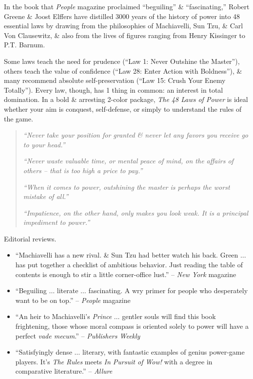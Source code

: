 \documentclass{article}
\begin{document}
\begin{enumerate}
	In the book that {\it People} magazine proclaimed ``beguiling'' \& ``fascinating,'' {\sc Robert Greene} \& {\sc Joost Elffers} have distilled 3000 years of the history of power into 48 essential laws by drawing from the philosophies of {\sc Machiavelli, Sun Tzu}, \& {\sc Carl Von Clausewitz}, \& also from the lives of figures ranging from {\sc Henry Kissinger} to {\sc P.T. Barnum}.
	
	Some laws teach the need for prudence (``Law 1: Never Outshine the Master''), others teach the value of confidence (``Law 28: Enter Action with Boldness''), \& many recommend absolute self-preservation (``Law 15: Crush Your Enemy Totally''). Every law, though, has 1 thing in common: an interest in total domination. In a bold \& arresting 2-color package, {\it The 48 Laws of Power} is ideal whether your aim is conquest, self-defense, or simply to understand the rules of the game.
	\begin{quotation}
		{\it``Never take your position for granted \& never let any favors you receive go to your head.''}
		
		{\it``Never waste valuable time, or mental peace of mind, on the affairs of others -- that is too high a price to pay.''}
		
		{\it``When it comes to power, outshining the master is perhaps the worst mistake of all.''}
		
		{\it``Impatience, on the other hand, only makes you look weak. It is a principal impediment to power.''}
	\end{quotation}
	{\sf Editorial reviews.}
	\begin{itemize}
		\item ``{\sc Machiavelli} has a new rival. \& {\sc Sun Tzu} had better watch his back. {\sc Green} $\ldots$ has put together a checklist of ambitious behavior. Just reading the table of contents is enough to stir a little corner-office lust.'' -- {\it New York} magazine
		\item ``Beguiling $\ldots$ literate $\ldots$ fascinating. A wry primer for people who desperately want to be on top.'' -- {\it People} magazine
		\item ``An heir to {\sc Machiavelli}'s {\it Prince} $\ldots$ gentler souls will find this book frightening, those whose moral compass is oriented solely to power will have a perfect {\it vade mecum}.'' -- {\it Publishers Weekly}
		\item ``Satisfyingly dense $\ldots$ literary, with fantastic examples of genius power-game players. It's {\it The Rules} meets {\it In Pursuit of Wow!} with a degree in comparative literature.'' -- {\it Allure}
	\end{itemize}
	

\end{enumerate}
\end{document}
